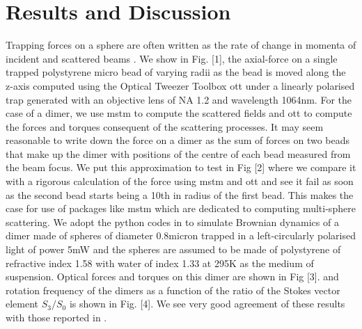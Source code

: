 \documentclass[preprint,  3p]{elsarticle}
\begin{document}
\section{Results and Discussion}
Trapping forces on a sphere are often written as the rate of change in momenta of incident and scattered beams \cite{Nieminen_2007}. We show in Fig. [1], the axial-force on a single trapped polystyrene micro bead of varying radii as the bead is moved along the z-axis computed using the Optical Tweezer Toolbox ott under a linearly polarised trap generated with an objective lens of NA 1.2 and wavelength 1064nm. For the case of a dimer, we use mstm to compute the scattered fields and ott to compute the forces and torques consequent of the scattering processes. It may seem reasonable to write down the force on a dimer as the sum of forces on two beads that make up the dimer with positions of the centre of each bead measured from the beam focus. We put this approximation to test in Fig [2] where we compare it with a rigorous calculation of the force using mstm and ott and see it fail as soon as the second bead starts being a 10th in radius of the first bead. This makes the case for use of packages like mstm which are dedicated to computing multi-sphere scattering. We adopt the python codes in \cite{Vigilante_2020} to simulate Brownian dynamics of a dimer made of spheres of diameter 0.8micron trapped in a left-circularly polarised light of power 5mW and the spheres are assumed to be made of polystyrene of refractive index 1.58 with water of index 1.33 at 295K as the medium of suspension. Optical forces and torques on this dimer are shown in Fig [3].  and rotation frequency of the dimers as a function of the ratio of the Stokes vector element $S_3/S_0$ is shown in Fig. [4]. We see very good agreement of these results with those reported in \cite{Vigilante_2020}. 
\end{document}
